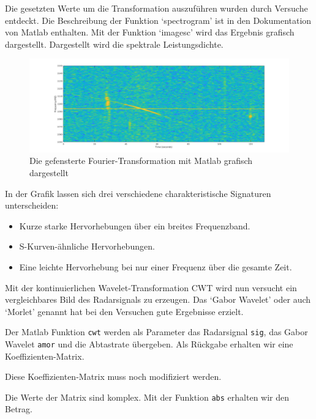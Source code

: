 \begin{refsection}
Die gesetzten Werte um die Transformation auszuführen wurden durch Versuche entdeckt. 
Die Beschreibung der Funktion `spectrogram' ist in den Dokumentation von Matlab enthalten.
Mit der Funktion `imagesc' wird das Ergebnis grafisch dargestellt.
Dargestellt wird die spektrale Leistungsdichte.

\begin{figure}
	\centering
	\includegraphics[width=\linewidth]{papers/meteor/images/signal_gfft.png}
	\caption{Die gefensterte Fourier-Transformation mit Matlab grafisch dargestellt}
	\label{fig:signalmitgfft}
\end{figure}
In der Grafik lassen sich drei verschiedene charakteristische Signaturen unterscheiden:
\begin{itemize}
	\item Kurze starke Hervorhebungen über ein breites Frequenzband.
	\item S-Kurven-ähnliche  Hervorhebungen.
	\item Eine leichte Hervorhebung bei nur einer Frequenz über die gesamte Zeit.
\end{itemize}
 
Mit der kontinuierlichen Wavelet-Transformation CWT wird nun versucht ein vergleichbares Bild des Radarsignals zu erzeugen.
Das `Gabor Wavelet' oder auch `Morlet' genannt hat bei den Versuchen gute Ergebnisse erzielt.

Der Matlab Funktion \texttt{cwt} werden als Parameter das Radarsignal {\texttt{sig}}, das Gabor Wavelet {\texttt{amor}} und die Abtastrate übergeben.
Als Rückgabe erhalten wir eine Koeffizienten-Matrix.

Diese Koeffizienten-Matrix muss noch modifiziert werden.

Die Werte der Matrix sind komplex.
Mit der Funktion \texttt{abs} erhalten wir den Betrag.


\end{refsection}
